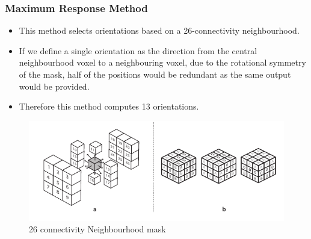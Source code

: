 \documentclass[9pt]{beamer}
\begin{document}
\begin{frame}
\frametitle { Maximum Response Method }
\begin{itemize}
\item This method selects orientations based on a 26-connectivity neighbourhood.
\item If we define a single orientation as the direction from the central neighbourhood voxel to a neighbouring voxel, due to the rotational symmetry of the mask, half of the positions would be redundant as the same output would be provided.
\item Therefore this method computes 13 orientations.
\end{itemize}
\begin{figure}
\includegraphics[scale=0.8]{cubeAngles13}
\caption{ 26 connectivity Neighbourhood mask}
\end{figure}
\end{frame}
 
\end{document}
